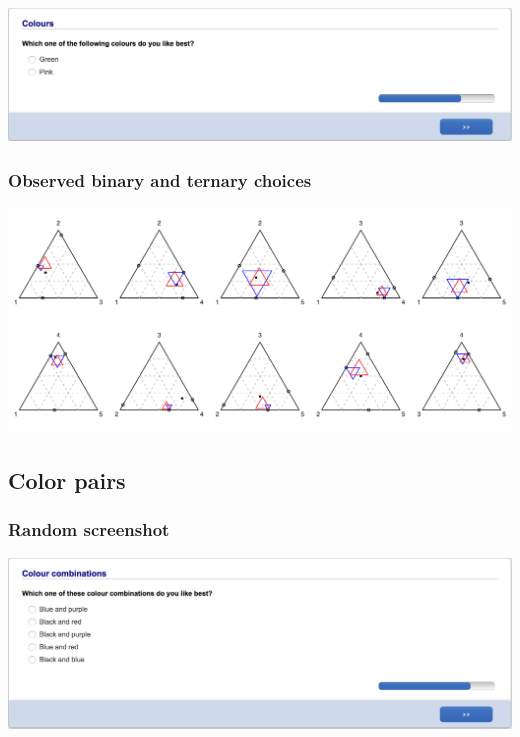 \documentclass[11pt,letter]{article}
\begin{document}
\includegraphics[width=15cm]{Population_study_design/screenshot_Colours.png}

\subsubsection*{Observed binary and ternary choices}

\includegraphics[width=15cm]{./Population_study_data/Simplexes/Colours.pdf}

\pagebreak

\subsection{Color pairs}



\subsubsection*{Random screenshot}

\includegraphics[width=15cm]{Population_study_design/screenshot_Colour_Pairs.png}
\end{document}
